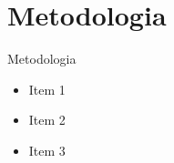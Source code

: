 \AtBeginSection[]{
	\begin{frame}
		\frametitle{}
		\tableofcontents[currentsection]
	\end{frame}
}

\section{Metodologia}
\begin{frame}{Metodologia}
	\begin{itemize}[<+->]
		\item Item 1
		\item Item 2
		\item Item 3
	\end{itemize}
\end{frame}
